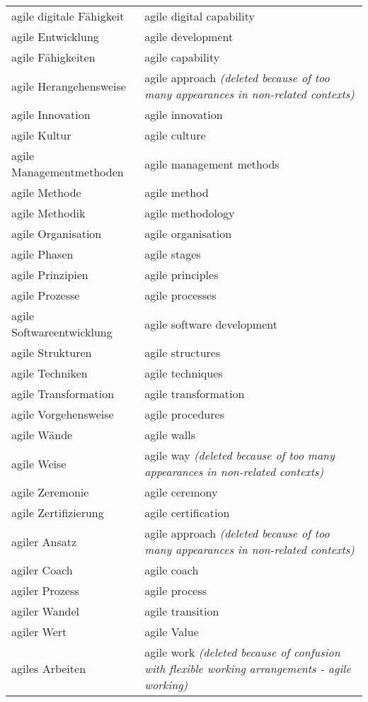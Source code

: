 \begin{spacing}{.5}
\begin{longtable}{ p{} p{}}
    agile digitale Fähigkeit & agile digital capability \\
    agile Entwicklung & agile development \\
    agile Fähigkeiten & agile capability \\
    agile Herangehensweise & agile approach \textit{(deleted because of too many appearances in non-related contexts)} \\
    agile Innovation & agile innovation \\
    agile Kultur & agile culture \\
    agile Managementmethoden & agile management methods \\
    agile Methode & agile method \\
    agile Methodik & agile methodology \\
    agile Organisation & agile organisation \\
    agile Phasen & agile stages \\
    agile Prinzipien & agile principles \\
    agile Prozesse & agile processes \\
    agile Softwareentwicklung & agile software development \\
    agile Strukturen & agile structures \\
    agile Techniken & agile techniques \\
    agile Transformation & agile transformation \\
    agile Vorgehensweise & agile procedures\\
    agile Wände & agile walls \\
    agile Weise & agile way \textit{(deleted because of too many appearances in non-related contexts)} \\
    agile Zeremonie & agile ceremony \\
    agile Zertifizierung & agile certification \\
    agiler Ansatz & agile approach \textit{(deleted because of too many appearances in non-related contexts)} \\
    agiler Coach & agile coach \\
    agiler Prozess & agile process \\
    agiler Wandel & agile transition \\
    agiler Wert & agile Value \\
    agiles Arbeiten & agile work \textit{(deleted because of confusion with flexible working arrangements - agile working)} \\

\end{longtable}
\end{spacing}
